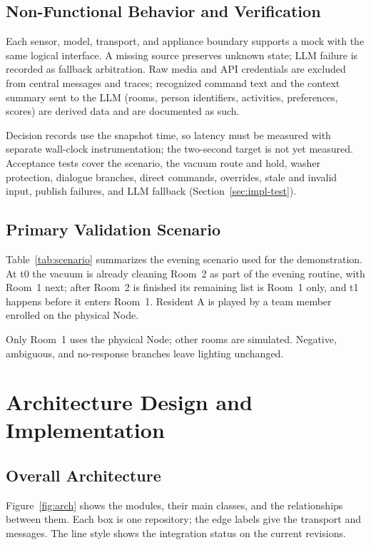 \documentclass[conference]{IEEEtran}
\begin{document}
\subsection{Non-Functional Behavior and Verification}
\label{sec:verification}

Each sensor, model, transport, and appliance boundary supports a
mock with the same logical interface. A missing source preserves
unknown state; LLM failure is recorded as fallback arbitration. Raw
media and API credentials are excluded from central messages and
traces; recognized command text and the context summary sent to the
LLM (rooms, person identifiers, activities, preferences, scores) are
derived data and are documented as such.

Decision records use the snapshot time, so latency must be measured
with separate wall-clock instrumentation; the two-second target is
not yet measured. Acceptance tests cover the scenario, the vacuum
route and hold, washer protection, dialogue branches, direct
commands, overrides, stale and invalid input, publish failures, and
LLM fallback (Section~\ref{sec:impl-test}).

\subsection{Primary Validation Scenario}
\label{sec:scenario}

Table~\ref{tab:scenario} summarizes the evening scenario used for the
demonstration. At t0 the vacuum is already cleaning Room~2 as part
of the evening routine, with Room~1 next; after Room~2 is finished
its remaining list is Room~1 only, and t1 happens before it enters
Room~1. Resident A is played by a team member enrolled on the
physical Node.

Only Room~1 uses the physical Node; other rooms are simulated.
Negative, ambiguous, and no-response branches leave lighting
unchanged.

\section{Architecture Design and Implementation}
\label{sec:arch}

\subsection{Overall Architecture}

Figure~\ref{fig:arch} shows the modules, their main classes, and the
relationships between them. Each box is one repository; the edge
labels give the transport and messages. The line style shows the
integration status on the current revisions.
\end{document}
